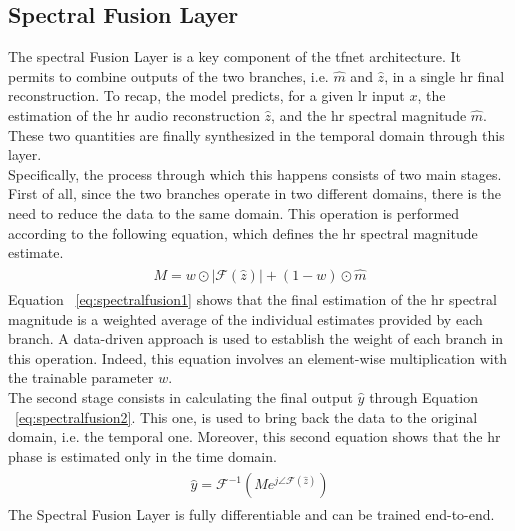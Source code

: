 \subsection{Spectral Fusion Layer}
The spectral Fusion Layer is a key component of the \gls{tfnet} architecture. It permits to combine outputs of the two branches, i.e. $\hat{m}$ and $\hat{z}$, in a single \gls{hr} final reconstruction. To recap, the model predicts, for a given \gls{lr} input $x$, the estimation of the \gls{hr} audio reconstruction $\hat{z}$, and the \gls{hr} spectral magnitude $\hat{m}$. These two quantities are finally synthesized in the temporal domain through this layer. \\
Specifically, the process through which this happens consists of two main stages. First of all, since the two branches operate in two different domains, there is the need to reduce the data to the same domain. This operation is performed according to the following equation, which defines the \gls{hr} spectral magnitude estimate. 
\begin{align}\label{eq:spectralfusion1}
	\begin{array}{c}
		M=w \odot|\mathscr{F}(\hat{z})|+(1-w) \odot \hat{m}
	\end{array}
\end{align}
Equation ~\ref{eq:spectralfusion1} shows that the final estimation of the \gls{hr} spectral magnitude is a weighted average of the individual estimates provided by each branch. A data-driven approach is used to establish the weight of each branch in this operation. Indeed, this equation involves an element-wise multiplication with the trainable parameter $w$. \\
The second stage consists in calculating the final output $\hat{y}$ through Equation ~\ref{eq:spectralfusion2}. This one, is used to bring back the data to the original domain, i.e. the temporal one. Moreover, this second equation shows that the \gls{hr} phase is estimated only in the time domain.
\begin{align}\label{eq:spectralfusion2}
	\begin{array}{c}
		\hat{y}=\mathscr{F}^{-1}\left(M e^{j \angle \mathscr{F}(\hat{z})}\right)
	\end{array}
\end{align}
The Spectral Fusion Layer is fully differentiable and can be trained end-to-end.

